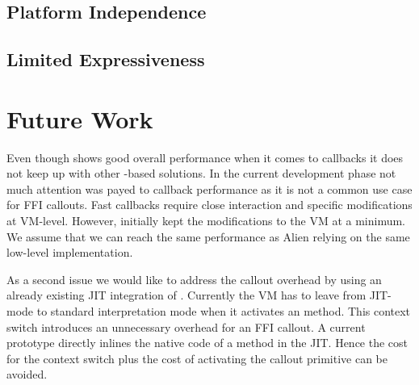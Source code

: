 \subsection{Platform Independence}


\subsection{Limited Expressiveness}



\section{Future Work}
Even though \NB shows good overall performance when it comes to callbacks it does not keep up with other \ST-based solutions.
In the current development phase not much attention was payed to callback performance as it is not a common use case for FFI callouts.
Fast callbacks require close interaction and specific modifications at VM-level.
However, initially \NB kept the modifications to the VM at a minimum.
We assume that we can reach the same performance as Alien relying on the same low-level implementation.

As a second issue we would like to address the callout overhead by using an already existing JIT integration of \NB.
Currently the VM has to leave from JIT-mode to standard interpretation mode when it activates an \NB method.
This context switch introduces an unnecessary overhead for an FFI callout.
A current prototype directly inlines the native code of a \NB method in the JIT.
Hence the cost for the context switch plus the cost of activating the \NB callout primitive can be avoided.



